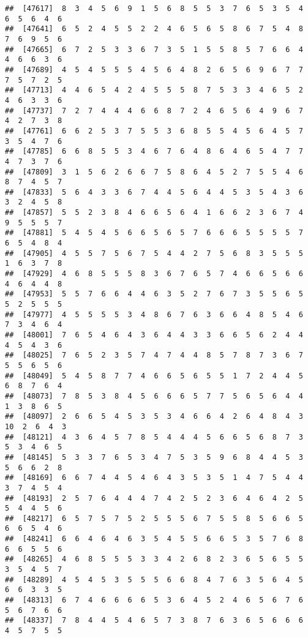\documentclass[
]{book}
\begin{document}
\begin{verbatim}
##  [47617]  8  3  4  5  6  9  1  5  6  8  5  5  3  7  6  5  3  5  4  6  5  6  4  6
##  [47641]  6  5  2  4  5  5  2  2  4  6  5  6  5  8  6  7  5  4  8  7  6  9  5  6
##  [47665]  6  7  2  5  3  3  6  7  3  5  1  5  5  8  5  7  6  6  4  4  6  6  3  6
##  [47689]  4  5  4  5  5  5  4  5  6  4  8  2  6  5  6  9  6  7  7  7  5  7  2  5
##  [47713]  4  4  6  5  4  2  4  5  5  5  8  7  5  3  3  4  6  5  2  4  6  3  3  6
##  [47737]  7  2  7  4  4  4  6  6  8  7  2  4  6  5  6  4  9  6  7  4  2  7  3  8
##  [47761]  6  6  2  5  3  7  5  5  3  6  8  5  5  4  5  6  4  5  7  3  5  4  7  6
##  [47785]  6  6  8  5  5  3  4  6  7  6  4  8  6  4  6  5  4  7  7  4  7  3  7  6
##  [47809]  3  1  5  6  2  6  6  7  5  8  6  4  5  2  7  5  5  4  6  8  7  4  5  7
##  [47833]  5  6  4  3  3  6  7  4  4  5  6  4  4  5  3  5  4  3  6  3  2  4  5  8
##  [47857]  5  5  2  3  8  4  6  6  5  6  4  1  6  6  2  3  6  7  4  9  5  5  5  7
##  [47881]  5  4  5  4  5  6  6  5  6  5  7  6  6  6  5  5  5  5  7  6  5  4  8  4
##  [47905]  4  5  5  7  5  6  7  5  4  4  2  7  5  6  8  3  5  5  5  1  6  3  7  8
##  [47929]  4  6  8  5  5  5  8  3  6  7  6  5  7  4  6  6  5  6  6  4  6  4  4  8
##  [47953]  5  5  7  6  6  4  4  6  3  5  2  7  6  7  3  5  5  6  5  5  2  5  5  5
##  [47977]  4  5  5  5  5  3  4  8  6  7  6  3  6  6  4  8  5  4  6  7  3  4  6  4
##  [48001]  7  6  5  4  6  4  3  6  4  4  3  3  6  6  5  6  2  4  4  4  5  4  3  6
##  [48025]  7  6  5  2  3  5  7  4  7  4  4  8  5  7  8  7  3  6  7  5  5  6  5  6
##  [48049]  5  4  5  8  7  7  4  6  6  5  6  5  5  1  7  2  4  4  5  6  8  7  6  4
##  [48073]  7  8  5  3  8  4  5  6  6  6  5  7  7  5  6  5  6  4  4  1  3  8  6  5
##  [48097]  2  6  6  5  4  5  3  5  3  4  6  6  4  2  6  4  8  4  3 10  2  6  4  3
##  [48121]  4  3  6  4  5  7  8  5  4  4  4  5  6  6  5  6  8  7  3  5  3  4  6  5
##  [48145]  5  3  3  7  6  5  3  4  7  5  3  5  9  6  8  4  4  5  3  5  6  6  2  8
##  [48169]  6  6  7  4  4  5  4  6  4  3  5  3  5  1  4  7  5  4  4  3  7  4  5  4
##  [48193]  2  5  7  6  4  4  4  7  4  2  5  2  3  6  4  6  4  2  5  5  4  4  5  6
##  [48217]  6  5  7  5  7  5  2  5  5  5  6  7  5  5  8  5  6  6  5  6  6  5  4  6
##  [48241]  6  6  4  6  4  6  3  5  4  5  5  6  6  5  3  5  7  6  8  6  6  5  5  6
##  [48265]  4  6  8  5  5  5  3  3  4  2  6  8  2  3  6  5  6  5  5  3  5  4  5  7
##  [48289]  4  5  4  5  3  5  5  5  6  6  8  4  7  6  3  5  6  4  5  6  6  3  3  5
##  [48313]  6  7  4  6  6  6  6  5  3  6  4  5  2  4  6  5  6  7  6  5  6  7  6  6
##  [48337]  7  8  4  4  5  4  6  5  7  3  8  7  6  3  6  5  6  6  6  4  5  7  5  5

\end{verbatim}
\end{document}
